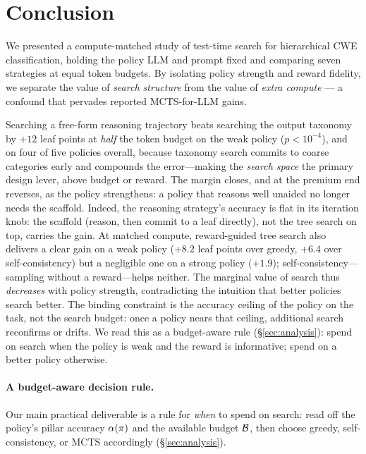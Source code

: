 \section{Conclusion}
\label{sec:conclusion}

We presented a compute-matched study of test-time search for hierarchical CWE
classification, holding the policy LLM and prompt fixed and comparing seven
strategies at equal token budgets. By isolating policy strength and reward
fidelity, we separate the value of \emph{search structure} from the value of
\emph{extra compute} --- a confound that pervades reported MCTS-for-LLM gains.

Searching a free-form reasoning trajectory beats searching the output taxonomy by
$+12$ leaf points at \emph{half} the token budget on the weak policy
($p{<}10^{-4}$), and on four of five policies overall, because taxonomy search
commits to coarse categories early and compounds the error---making the
\emph{search space} the primary design lever, above budget or reward. The margin
closes, and at the premium end reverses, as the policy strengthens: a policy that
reasons well unaided no longer needs the scaffold. Indeed, the reasoning
strategy's accuracy is flat in its iteration knob: the scaffold (reason, then
commit to a leaf directly), not the tree search on top, carries the gain. At matched compute, reward-guided tree search also delivers a clear gain on
a weak policy ($+8.2$ leaf points over greedy, $+6.4$ over self-consistency) but a
negligible one on a strong policy ($+1.9$); self-consistency---sampling without a
reward---helps neither. The marginal value of search thus \emph{decreases} with
policy strength, contradicting the intuition that better policies search better.
The binding constraint is the accuracy ceiling of the policy on the task, not the
search budget: once a policy nears that ceiling, additional search reconfirms or
drifts. We read this as a budget-aware rule (\S\ref{sec:analysis}): spend on search
when the policy is weak and the reward is informative; spend on a better policy
otherwise.

\paragraph{A budget-aware decision rule.}
Our main practical deliverable is a rule for \emph{when} to spend on search:
read off the policy's pillar accuracy $\alpha(\pi)$ and the available budget
$\mathcal{B}$, then choose greedy, self-consistency, or MCTS accordingly
(\S\ref{sec:analysis}).

